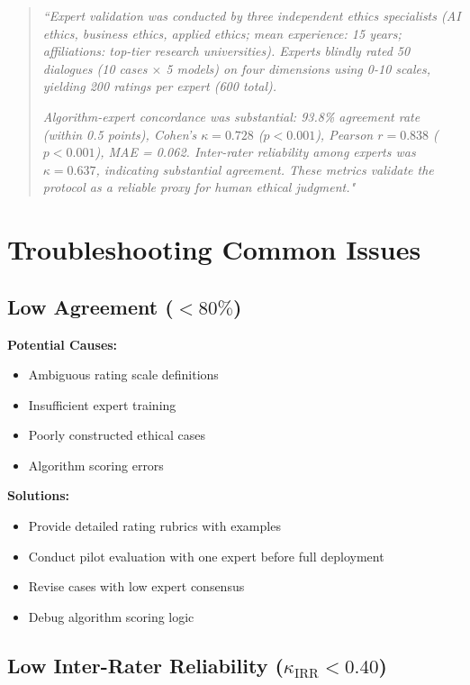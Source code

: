\documentclass[11pt]{article}
\begin{document}
\begin{quote}
\textit{``Expert validation was conducted by three independent ethics specialists (AI ethics, business ethics, applied ethics; mean experience: 15 years; affiliations: top-tier research universities). Experts blindly rated 50 dialogues (10 cases $\times$ 5 models) on four dimensions using 0-10 scales, yielding 200 ratings per expert (600 total).}

\textit{Algorithm-expert concordance was substantial: 93.8\% agreement rate (within 0.5 points), Cohen's $\kappa = 0.728$ ($p < 0.001$), Pearson $r = 0.838$ ($p < 0.001$), MAE = 0.062. Inter-rater reliability among experts was $\kappa = 0.637$, indicating substantial agreement. These metrics validate the protocol as a reliable proxy for human ethical judgment."}
\end{quote}

\section{Troubleshooting Common Issues}

\subsection{Low Agreement ($< 80\%$)}

\textbf{Potential Causes:}
\begin{itemize}[noitemsep]
    \item Ambiguous rating scale definitions
    \item Insufficient expert training
    \item Poorly constructed ethical cases
    \item Algorithm scoring errors
\end{itemize}

\textbf{Solutions:}
\begin{itemize}[noitemsep]
    \item Provide detailed rating rubrics with examples
    \item Conduct pilot evaluation with one expert before full deployment
    \item Revise cases with low expert consensus
    \item Debug algorithm scoring logic
\end{itemize}

\subsection{Low Inter-Rater Reliability ($\kappa_{\text{IRR}} < 0.40$)}
\end{document}

